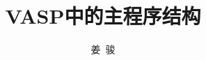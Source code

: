 
\title{\rm{VASP}中的主程序结构}
\author[ ]{姜~骏}   %
\renewcommand*{\Authfont}{\small\rm} %
\renewcommand*{\Affilfont}{\small\it} %
\renewcommand\Authands{ and } %
\renewcommand\Authands{ , } %
\date{} %


\maketitle

